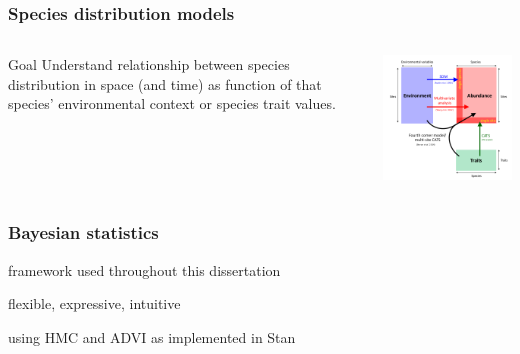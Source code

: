 \documentclass{beamer}
\begin{document}
\begin{frame}
  \frametitle{Species distribution models}

  \begin{columns}
    \begin{column}{0.5\textwidth}
      \begin{block}{Goal}
        Understand relationship between species distribution in space (and time) as function of that species' environmental context or species trait values.
      \end{block}
    \end{column}
    \begin{column}{0.5\textwidth}
      \includegraphics[width = \textwidth,height = 0.8\textheight,keepaspectratio = true]{figure/warton_corner_models}

      \footnotesize{}
    \end{column}
  \end{columns}
\end{frame}


\begin{frame}
  \frametitle{Bayesian statistics}

  framework used throughout this dissertation

  flexible, expressive, intuitive

  using HMC and ADVI as implemented in Stan 
\end{frame}
\end{document}
